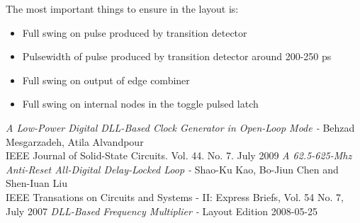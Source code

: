 \documentclass[a4paper,12pt]{article} \usepackage{graphicx}
\begin{document}
The most important things to ensure in the layout is:
\begin{itemize}
        \item Full swing on pulse produced by transition detector
        \item Pulsewidth of pulse produced by transition detector around 200-250 ps
        \item Full swing on output of edge combiner
        \item Full swing on internal nodes in the toggle pulsed latch
\end{itemize}

\newpage 
\appendix 
\newpage

\begin{thebibliography}{99}
        \textit{A Low-Power Digital DLL-Based Clock Generator in Open-Loop Mode - }
                Behzad Mesgarzadeh, Atila Alvandpour \\
                IEEE Journal of Solid-State Circuits. Vol. 44. No. 7. July 2009
        \textit{A 62.5-625-Mhz Anti-Reset All-Digital Delay-Locked Loop - }
                Shao-Ku Kao, Bo-Jiun Chen and Shen-Iuan Liu \\
                IEEE Transations on Circuits and Systems - II: Express Briefs, Vol. 54 No. 7, July 2007
        \textit{DLL-Based Frequency Multiplier - }
                Layout Edition 2008-05-25 

\end{thebibliography}
\end{document}
